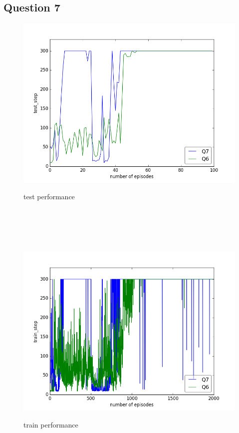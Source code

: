 \documentclass{report}
\begin{document}
\subsection*{Question 7}

\begin{figure}[H]
\begin{minipage}[c]{.49\linewidth}
	\centering
	\includegraphics[width = \linewidth]{plots/a7/test_step.png}
	\caption{test performance}
    \end{minipage}
    \hfill%
\begin{minipage}[c]{.49\linewidth}
    \centering 
    \includegraphics[width = \linewidth]{plots/a7/train_step.png}
	\caption{train performance}
\end{minipage}

\end{figure}
\end{document}

